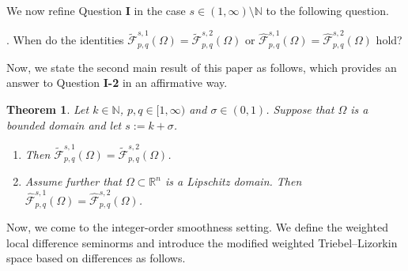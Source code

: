 \documentclass[11pt,twoside]{article}
\def\nn{{\mathbb N}}
\def\hf{{\mathscr F }}
\def\boz{{\Omega}}
\def\sz{\sigma}
\newtheorem{theorem}{Theorem}[section]
\theoremstyle{mylem}
\theoremstyle{definition}
\numberwithin{equation}{section}
\begin{document}
We now refine  Question {\bf I} in the case $s\in(1,\infty)\setminus\mathbb{N}$ to the following question.
\medskip 

{.
When do the identities $\widetilde{\hf}_{p,q}^{s,1}(\boz) =\widetilde{\hf}_{p,q}^{s,2}(\boz)$
or $\widehat{\hf}_{p,q}^{s,1}(\boz)
=\widehat{\hf}_{p,q}^{s,2}(\boz)$ hold?}	

\medskip 

Now, we state the second main result of this paper as follows, which provides an answer to 
Question {\bf I-2} in an affirmative way.

\begin{theorem}\label{thm-secmain}
Let $k \in \nn$, $p, q \in [1, \infty)$ and $\sigma\in(0,1)$. Suppose that $\boz$ is a bounded domain and let $s := k + \sz$.
\begin{enumerate}
\item[\rm(i)]
Then $\widetilde{\hf}_{p,q}^{s,1}(\boz) =\widetilde{\hf}_{p,q}^{s,2}(\boz)$.

\item[\rm(ii)]
Assume further that \(\Omega\subset\mathbb{R}^n\) is a Lipschitz domain.
Then $\widehat{\hf}_{p,q}^{s,1}(\boz)=
\widehat{\hf}_{p,q}^{s,2}(\boz)$.
\end{enumerate} 
\end{theorem}

Now, we come to the integer-order smoothness setting. We define the weighted local difference seminorms 
and introduce the modified weighted  Triebel--Lizorkin space based on differences as follows.
\end{document}
